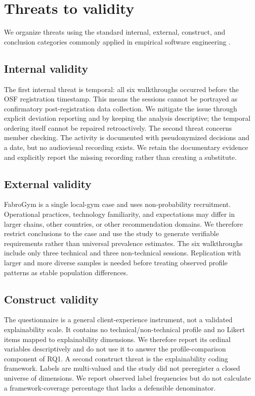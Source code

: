 \documentclass[pdflatex,sn-basic]{sn-jnl}
\begin{document}
\section{Threats to validity}\label{sec:validity}
We organize threats using the standard internal, external, construct, and conclusion categories commonly applied in empirical software engineering \cite{wohlin2012,siegmund2015}.

\subsection{Internal validity}
The first internal threat is temporal: all six walkthroughs occurred before the OSF registration timestamp. This means the sessions cannot be portrayed as confirmatory post-registration data collection. We mitigate the issue through explicit deviation reporting and by keeping the analysis descriptive; the temporal ordering itself cannot be repaired retroactively. The second threat concerns member checking. The activity is documented with pseudonymized decisions and a date, but no audiovisual recording exists. We retain the documentary evidence and explicitly report the missing recording rather than creating a substitute.

\subsection{External validity}
FabroGym is a single local-gym case and uses non-probability recruitment. Operational practices, technology familiarity, and expectations may differ in larger chains, other countries, or other recommendation domains. We therefore restrict conclusions to the case and use the study to generate verifiable requirements rather than universal prevalence estimates. The six walkthroughs include only three technical and three non-technical sessions. Replication with larger and more diverse samples is needed before treating observed profile patterns as stable population differences.

\subsection{Construct validity}
The questionnaire is a general client-experience instrument, not a validated explainability scale. It contains no technical/non-technical profile and no Likert items mapped to explainability dimensions. We therefore report its ordinal variables descriptively and do not use it to answer the profile-comparison component of RQ1. A second construct threat is the explainability coding framework. Labels are multi-valued and the study did not preregister a closed universe of dimensions. We report observed label frequencies but do not calculate a framework-coverage percentage that lacks a defensible denominator.
\end{document}
